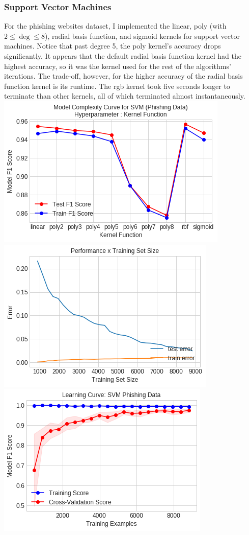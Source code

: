 \documentclass[11pt, a4paper]{article} %
\begin{document}
\subsubsection{Support Vector Machines}
For the phishing websites dataset, I implemented the linear, poly (with $2\leq \deg\leq 8$), radial basis function, and sigmoid kernels for support vector machines. Notice that past degree 5, the poly kernel's accuracy drops significantly. It appears that the default radial basis function kernel had the highest accuracy, so it was the kernel used for the rest of the algorithms' iterations. The trade-off, however, for the higher accuracy of the radial basis function kernel is its runtime. The rgb kernel took five seconds longer to terminate than other kernels, all of which terminated almost instantaneously. 
\newline\newline
\includegraphics[scale=0.55]{SVM_Model_Complexity_2.png}
\includegraphics[scale=0.55]{SVM_LC.png}
\newline\newline
\includegraphics[scale=0.55]{SVM_Learning_Curve_2.png}
\end{document}
